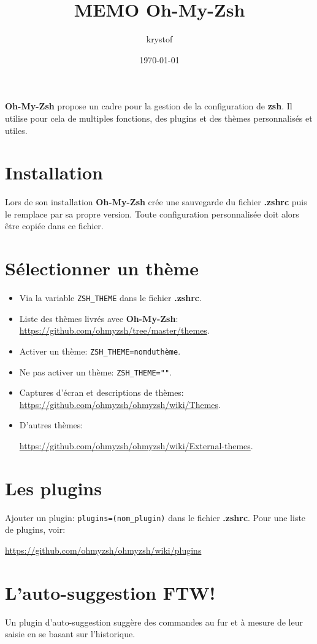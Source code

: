 \documentclass[a4paper,11pt]{article}
\title{MEMO Oh-My-Zsh}
\author{krystof}
\date{\today}
\begin{document}
\maketitle

\textbf{Oh-My-Zsh} propose un cadre pour la gestion de la configuration de \textbf{zsh}. Il utilise pour cela de multiples fonctions, des plugins et des thèmes personnalisés et utiles.
\medskip

\section{Installation}
Lors de son installation \textbf{Oh-My-Zsh} crée une sauvegarde du fichier \textbf{.zshrc} puis le remplace par sa propre version. Toute configuration personnalisée doit alors être copiée dans ce fichier.
\medskip

\section{Sélectionner un thème}
\begin{itemize}
	\item Via la variable \verb|ZSH_THEME| dans le fichier \textbf{.zshrc}.
	\item Liste des thèmes livrés avec \textbf{Oh-My-Zsh}: \url{https://github.com/ohmyzsh/tree/master/themes}.
	\item Activer un thème: \verb|ZSH_THEME=nomduthème|.
	\item Ne pas activer un thème: \verb|ZSH_THEME=""|.
	\item Captures d'écran et descriptions de thèmes: \url{https://github.com/ohmyzsh/ohmyzsh/wiki/Themes}.
	\item D'autres thèmes: 
	
	\url{https://github.com/ohmyzsh/ohmyzsh/wiki/External-themes}.
\end{itemize}
\medskip

\section{Les plugins}
Ajouter un plugin: \verb|plugins=(nom_plugin)| dans le fichier \textbf{.zshrc}. Pour une liste de plugins, voir:

\url{https://github.com/ohmyzsh/ohmyzsh/wiki/plugins}
\medskip

\section{L'auto-suggestion \textbf{FTW!}}
Un plugin d'auto-suggestion suggère des commandes au fur et à mesure de leur saisie en se basant sur l'historique.
\end{document}
